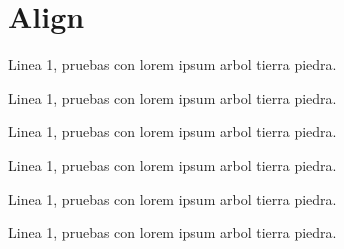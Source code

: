%
%

\lipsum[6]

\lipsum[6]

\lipsum[6]

\lipsum[6]

\lipsum[4]


\insertequation[\label{arg1}]{arg2}
\insertequationcaptioned[\label{arg2}]{arg2}{}

\newpage
\section{Align}
Linea 1, pruebas con lorem ipsum arbol tierra piedra.


Linea 1, pruebas con lorem ipsum arbol tierra piedra.


Linea 1, pruebas con lorem ipsum arbol tierra piedra.

\insertalign[\label{align1}]{arg2}

Linea 1, pruebas con lorem ipsum arbol tierra piedra.


Linea 1, pruebas con lorem ipsum arbol tierra piedra.


Linea 1, pruebas con lorem ipsum arbol tierra piedra.


